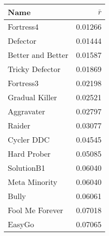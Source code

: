 \begin{tabular}{lr}
\toprule
Name              &        $\bar{r}$                 \\
\midrule
Fortress4         &                           0.01266 \\
Defector          &                           0.01444 \\
Better and Better &                           0.01587 \\
Tricky Defector   &                           0.01869 \\
Fortress3         &                           0.02198 \\
Gradual Killer    &                           0.02521 \\
Aggravater        &                           0.02797 \\
Raider            &                           0.03077 \\
Cycler DDC        &                           0.04545 \\
Hard Prober       &                           0.05085 \\
SolutionB1        &                           0.06040 \\
Meta Minority     &                           0.06040 \\
Bully             &                           0.06061 \\
Fool Me Forever   &                           0.07018 \\
EasyGo            &                           0.07065 \\
\bottomrule
\end{tabular}
